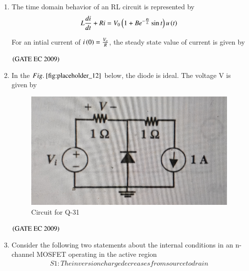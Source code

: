\documentclass[journal,12pt,onecolumn]{IEEEtran}
\theoremstyle{remark}
\begin{document}
\begin{enumerate}
\item The time domain behavior of an RL circuit is represented by 
\begin{align*} 
 L\frac{di}{dt} + Ri = V_0 \brak{1+ Be^{-\frac{Rt}{L}} \sin t } u\brak{t}
\end{align*}

For an intial current of $i\brak{0} = \frac{V_o}{R}$, the steady state value of current is given by 
\begin{enumerate}
\end{enumerate}
\hfill $\brak{\text{GATE EC 2009}}$

\item In the $\figref{fig:placeholder_12}$ below, the diode is ideal. The voltage V is given by
\begin{figure}[H]
    \centering
    \includegraphics[width=0.5\columnwidth]{figs/fig_12.jpg}
    \caption{\centering Circuit for Q-31}
    \label{fig:placeholder_12}
\end{figure}
\begin{enumerate}
\end{enumerate}
\hfill $\brak{\text{GATE EC 2009}}$

\item Consider the following two statements about the internal conditions in an n-channel MOSFET operating in the active region 
\begin{align*}
    S1: The inversion charge decreases from source to drain
    

\end{align*}
\end{enumerate}
\end{document}
